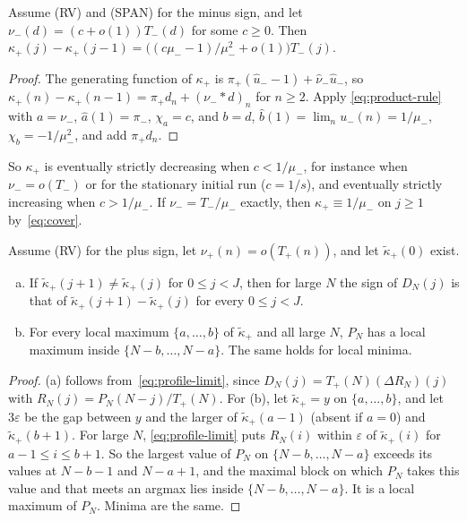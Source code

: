 \begin{lemma}\label{lem:prep-diff}
Assume (RV) and (SPAN) for the minus sign, and let $\nu_\minus(d)=(c+o(1))T_\minus(d)$ for
some $c\ge0$. Then
$\kappa_\plus(j)-\kappa_\plus(j-1)=\bigl((c\mu_\minus-1)/\mu_\minus^2+o(1)\bigr)T_\minus(j)$.
\end{lemma}

\begin{proof}
The generating function of $\kappa_\plus$ is $\pi_\plus(\hat u_\minus-1)+\hat\nu_\minus\hat u_\minus$,
so $\kappa_\plus(n)-\kappa_\plus(n-1)=\pi_\plus d_n+(\nu_\minus*d)_n$ for $n\ge2$. Apply
\eqref{eq:product-rule} with $a=\nu_\minus$, $\hat a(1)=\pi_\minus$, $\chi_a=c$, and $b=d$,
$\hat b(1)=\lim_nu_\minus(n)=1/\mu_\minus$, $\chi_b=-1/\mu_\minus^2$, and add $\pi_\plus d_n$.
\end{proof}

So $\kappa_\plus$ is eventually strictly decreasing when $c<1/\mu_\minus$, for instance when
$\nu_\minus=o(T_\minus)$ or for the stationary initial run ($c=1/s$), and eventually strictly
increasing when $c>1/\mu_\minus$. If $\nu_\minus=T_\minus/\mu_\minus$ exactly, then
$\kappa_\plus\equiv1/\mu_\minus$ on $j\ge1$ by~\eqref{eq:cover}.

\begin{proposition}\label{prop:copy}
Assume (RV) for the plus sign, let $\nu_\plus(n)=o(T_\plus(n))$, and let
$\widetilde\kappa_\plus(0)$ exist.
\begin{enumerate}[(a)]
\item If $\widetilde\kappa_\plus(j+1)\ne\widetilde\kappa_\plus(j)$ for $0\le j<J$, then for
large $N$ the sign of $D_N(j)$ is that of $\widetilde\kappa_\plus(j+1)-\widetilde\kappa_\plus(j)$
for every $0\le j<J$.
\item For every local maximum $\{a,\dots,b\}$ of $\widetilde\kappa_\plus$ and all large $N$,
$P_N$ has a local maximum inside $\{N-b,\dots,N-a\}$. The same holds for local minima.
\end{enumerate}
\end{proposition}

\begin{proof}
(a) follows from~\eqref{eq:profile-limit}, since $D_N(j)=T_\plus(N)(\Delta R_N)(j)$ with
$R_N(j)=P_N(N-j)/T_\plus(N)$. For (b), let $\widetilde\kappa_\plus=y$ on $\{a,\dots,b\}$,
and let $3\varepsilon$ be the gap between $y$ and the larger of $\widetilde\kappa_\plus(a-1)$
(absent if $a=0$) and $\widetilde\kappa_\plus(b+1)$. For large $N$, \eqref{eq:profile-limit}
puts $R_N(i)$ within $\varepsilon$ of $\widetilde\kappa_\plus(i)$ for $a-1\le i\le b+1$. So the
largest value of $P_N$ on $\{N-b,\dots,N-a\}$ exceeds its values at $N-b-1$ and $N-a+1$, and
the maximal block on which $P_N$ takes this value and that meets an argmax lies inside
$\{N-b,\dots,N-a\}$. It is a local maximum of $P_N$. Minima are the same.
\end{proof}

